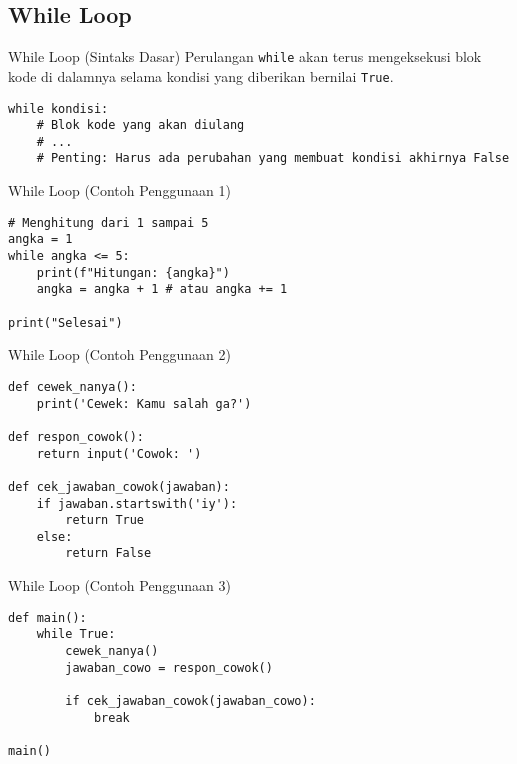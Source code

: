 \documentclass[aspectratio=169, table]{beamer}
\begin{document}
\subsection{While Loop}
\begin{frame}[fragile]{While Loop (Sintaks Dasar)}
Perulangan \texttt{while} akan terus mengeksekusi blok kode di dalamnya selama kondisi yang diberikan bernilai \texttt{True}.

\begin{lstlisting}[style=PythonStyle, caption={Sintaks Dasar Perulangan while}]
while kondisi:
    # Blok kode yang akan diulang
    # ...
    # Penting: Harus ada perubahan yang membuat kondisi akhirnya False
\end{lstlisting}
\end{frame}

\begin{frame}[fragile]{While Loop (Contoh Penggunaan 1)}
\begin{lstlisting}[style=PythonStyle, caption={Kode Python: while_loop.py}]
# Menghitung dari 1 sampai 5
angka = 1
while angka <= 5:
    print(f"Hitungan: {angka}")
    angka = angka + 1 # atau angka += 1

print("Selesai")
\end{lstlisting}
\end{frame}

\begin{frame}[fragile]{While Loop (Contoh Penggunaan 2)}
\begin{lstlisting}[style=PythonStyle, caption={Kode Python: cowok_selalu_salah.py}]
def cewek_nanya():
    print('Cewek: Kamu salah ga?')

def respon_cowok():
    return input('Cowok: ')

def cek_jawaban_cowok(jawaban):
    if jawaban.startswith('iy'):
        return True
    else:
        return False
\end{lstlisting}
\end{frame}

\begin{frame}[fragile]{While Loop (Contoh Penggunaan 3)}
\begin{lstlisting}[style=PythonStyle, caption={Kode Python: cowok_selalu_salah.py}]
def main():
    while True:
        cewek_nanya()
        jawaban_cowo = respon_cowok()

        if cek_jawaban_cowok(jawaban_cowo):
            break

main()
\end{lstlisting}
\end{frame}
\end{document}
